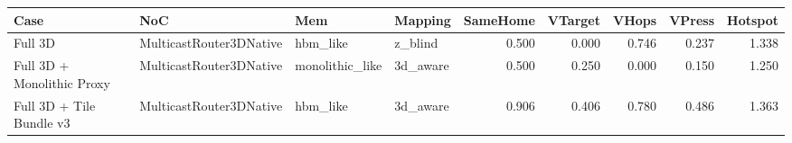 \begin{tabular}{l l l l r r r r r}
\hline
Case & NoC & Mem & Mapping & SameHome & VTarget & VHops & VPress & Hotspot \\
\hline
Full 3D & MulticastRouter3DNative & hbm\_like & z\_blind & 0.500 & 0.000 & 0.746 & 0.237 & 1.338 \\
Full 3D + Monolithic Proxy & MulticastRouter3DNative & monolithic\_like & 3d\_aware & 0.500 & 0.250 & 0.000 & 0.150 & 1.250 \\
Full 3D + Tile Bundle v3 & MulticastRouter3DNative & hbm\_like & 3d\_aware & 0.906 & 0.406 & 0.780 & 0.486 & 1.363 \\
\hline
\end{tabular}
